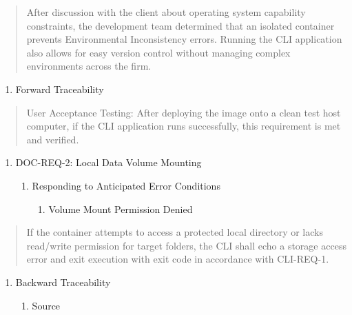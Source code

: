 \documentclass[
]{article}
\begin{document}
\begin{quote}
After discussion with the client about operating system capability
constraints, the development team determined that an isolated container
prevents Environmental Inconsistency errors. Running the CLI application
also allows for easy version control without managing complex
environments across the firm.
\end{quote}

\begin{enumerate}
\def\labelenumi{\alph{enumi}.}
\item
  Forward Traceability
\end{enumerate}

\begin{quote}
User Acceptance Testing: After deploying the image onto a clean test
host computer, if the CLI application runs successfully, this
requirement is met and verified.
\end{quote}

\begin{enumerate}
\def\labelenumi{\Roman{enumi})}
\setcounter{enumi}{1}
\item
  DOC-REQ-2: Local Data Volume Mounting

  \begin{enumerate}
  \def\labelenumii{\alph{enumii}.}
  \item
    Responding to Anticipated Error Conditions

    \begin{enumerate}
    \def\labelenumiii{\roman{enumiii}.}
    \item
      Volume Mount Permission Denied
    \end{enumerate}
  \end{enumerate}
\end{enumerate}

\begin{quote}
If the container attempts to access a protected local directory or lacks
read/write permission for target folders, the CLI shall echo a storage
access error and exit execution with exit code in accordance with
CLI-REQ-1.
\end{quote}

\begin{enumerate}
\def\labelenumi{\alph{enumi}.}
\setcounter{enumi}{1}
\item
  Backward Traceability

  \begin{enumerate}
  \def\labelenumii{\roman{enumii}.}
  \item
    Source
  \end{enumerate}
\end{enumerate}
\end{document}
